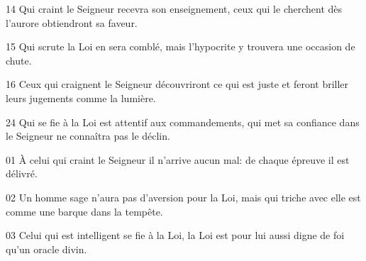 14 Qui craint le Seigneur recevra son enseignement, ceux qui le cherchent dès l’aurore obtiendront sa faveur.

15 Qui scrute la Loi en sera comblé, mais l’hypocrite y trouvera une occasion de chute.

16 Ceux qui craignent le Seigneur découvriront ce qui est juste et feront briller leurs jugements comme la lumière.

24 Qui se fie à la Loi est attentif aux commandements, qui met sa confiance dans le Seigneur ne connaîtra pas le déclin.

01 À celui qui craint le Seigneur il n’arrive aucun mal: de chaque épreuve il est délivré.

02 Un homme sage n’aura pas d’aversion pour la Loi, mais qui triche avec elle est comme une barque dans la tempête.

03 Celui qui est intelligent se fie à la Loi, la Loi est pour lui aussi digne de foi qu’un oracle divin.

